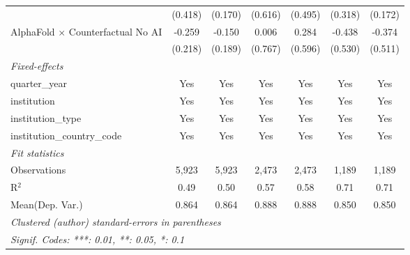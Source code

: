 \begin{tabular}{lcccccc}
                                            & (0.418)       & (0.170)       & (0.616)     & (0.495)       & (0.318)     & (0.172)\\   
   AlphaFold $\times$ Counterfactual No AI  & -0.259        & -0.150        & 0.006       & 0.284         & -0.438      & -0.374\\   
                                            & (0.218)       & (0.189)       & (0.767)     & (0.596)       & (0.530)     & (0.511)\\   
   \midrule
   \emph{Fixed-effects}\\
   quarter\_year                            & Yes           & Yes           & Yes         & Yes           & Yes         & Yes\\  
   institution                              & Yes           & Yes           & Yes         & Yes           & Yes         & Yes\\  
   institution\_type                        & Yes           & Yes           & Yes         & Yes           & Yes         & Yes\\  
   institution\_country\_code               & Yes           & Yes           & Yes         & Yes           & Yes         & Yes\\  
   \midrule
   \emph{Fit statistics}\\
   Observations                             & 5,923         & 5,923         & 2,473       & 2,473         & 1,189       & 1,189\\  
   R$^2$                                    & 0.49          & 0.50          & 0.57        & 0.58          & 0.71        & 0.71\\  
Mean(Dep. Var.) & 0.864 & 0.864 & 0.888 & 0.888 & 0.850 & 0.850 \\
   \midrule \midrule
   \multicolumn{7}{l}{\emph{Clustered (author) standard-errors in parentheses}}\\
   \multicolumn{7}{l}{\emph{Signif. Codes: ***: 0.01, **: 0.05, *: 0.1}}\\
\end{tabular}
\par\endgroup
